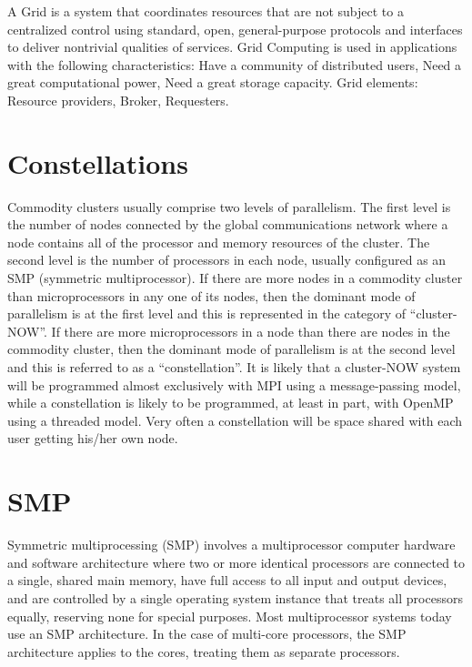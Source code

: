 \documentclass{article}
\begin{document}
A Grid is a system that coordinates resources that are not subject to a centralized control using standard, open, general-purpose protocols and interfaces to deliver nontrivial qualities of services\cite{foster2002grid}. Grid Computing is used in applications with the following characteristics: Have a community of distributed users, Need a great computational power, Need a great storage capacity. Grid elements: Resource providers, Broker, Requesters.



\section{Constellations}


Commodity clusters usually comprise two levels of parallelism. The first level is the number of nodes connected by the global communications network where a node contains all of the processor and memory resources of the cluster. The second level is the number of processors in each node, usually configured as an SMP (symmetric multiprocessor). If there are more nodes in a commodity cluster than microprocessors in any one of its nodes, then the dominant mode of parallelism is at the first level and this is represented in the category of “cluster-NOW”. If there are more microprocessors in a node than there are nodes in the commodity cluster, then the dominant mode of parallelism is at the second level and this is referred to as a “constellation”. It is likely that a cluster-NOW system will be programmed almost exclusively with MPI using a message-passing model, while a constellation is likely to be programmed, at least in part, with OpenMP using a threaded model. Very often a constellation will be space shared with each user getting his/her own node\cite{dongarra2005high}.

\section{SMP}


Symmetric multiprocessing (SMP) involves a multiprocessor computer hardware and software architecture where two or more identical processors are connected to a single, shared main memory, have full access to all input and output devices, and are controlled by a single operating system instance that treats all processors equally, reserving none for special purposes. Most multiprocessor systems today use an SMP architecture. In the case of multi-core processors, the SMP architecture applies to the cores, treating them as separate processors. 
\end{document}
